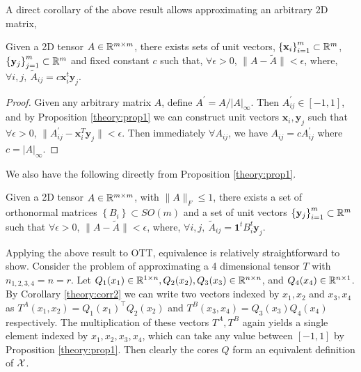 A direct corollary of the above result allows approximating an arbitrary 2D matrix,
\begin{corollary}\label{theory:corr1}
Given a 2D tensor $A \in \mathbb{R}^{m \times m}$, there exists sets of unit vectors, $\left\{\mathbf{x}_i\right\}_{i=1}^m\subset \mathbb{R}^m$, $\left\{\mathbf{y}_j\right\}_{j=1}^m\subset \mathbb{R}^m$ and fixed constant $c$ such that, $\forall \epsilon > 0$, $\|A-\widetilde{A}\|< \epsilon$, where, $\forall i,j,\: \widetilde{A}_{ij}=c\mathbf{x}_i^t\mathbf{y}_j$.
\end{corollary}
\begin{proof}
Given any arbitrary matrix $A$, define $A^\prime = A/|A|_{\infty}$. Then $A^\prime_{ij} \in [-1,1]$, and by Proposition \ref{theory:prop1} we can construct unit vectors $\textbf{x}_i,\textbf{y}_j$ such that $\forall \epsilon > 0$, $\|A^\prime_{ij} - \textbf{x}_i^T\textbf{y}_j\|< \epsilon$. Then immediately $\forall A_{ij}$, we have $A_{ij} = cA^\prime_{ij}$ where $c = |A|_\infty$.
\end{proof}

We also have the following directly from Proposition \ref{theory:prop1}.
\begin{corollary}\label{theory:corr2}
Given a 2D tensor $A\in \mathbb{R}^{m\times m}$, with $\|A\|_F\leq 1$, there exists a set of orthonormal matrices $\left\{B_i\right\} \subset SO(m)$ and a set of unit vectors $\left\{\mathbf{y}_j\right\}_{i=1}^m\subset \mathbb{R}^m$ such that $\forall \epsilon > 0$, $\|A - \widetilde{A}\|< \epsilon$, where, $\forall i,j,\: \widetilde{A}_{ij}= \mathbf{1}^t B_i^t\mathbf{y}_j$.
\end{corollary}

\begin{example}Applying the above result to OTT, equivalence is relatively straightforward to show. 
Consider the problem of approximating a 4 dimensional tensor $T$ with $n_{1,2,3,4}=n=r$. Let $Q_1(x_1) \in \mathbb{R}^{1\times n}, Q_2(x_2), Q_3(x_3) \in \mathbb{R}^{n \times n}$, and $Q_4(x_4) \in \mathbb{R}^{n \times 1}$. By Corollary \ref{theory:corr2} we can write two vectors indexed by $x_1,x_2$ and $x_3,x_4$ as $T^A (x_1,x_2) = Q_1(x_1)^\top Q_2(x_2)$ and  $T^B(x_3,x_4) = Q_3(x_3)Q_4(x_4)$ respectively. The multiplication of these vectors $T^A,T^B$ again yields a single element indexed by $x_1,x_2,x_3,x_4$, which can take any value between $[-1,1]$ by Proposition \ref{theory:prop1}. Then clearly the cores $Q$ form an equivalent definition of $\mathcal{X}$.
\end{example}

